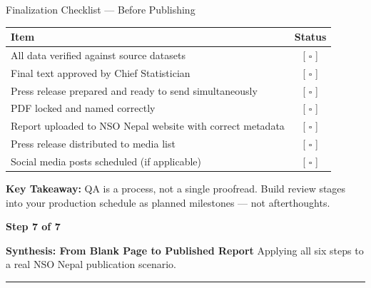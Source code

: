 \documentclass[xcolor={table,dvipsnames},aspectratio=169,11pt]{beamer}
\newcommand{\stepbadge}[1]{%
    \begin{tcolorbox}[colback=nsoGold,colframe=nsoGold,arc=8pt,auto outer arc,
        halign=center,valign=center,width=2.5cm,boxrule=0pt,top=2pt,bottom=2pt,left=2pt,right=2pt]
        \color{white}\tiny\bfseries #1
    \end{tcolorbox}%
}
\begin{document}
\begin{frame}{Finalization Checklist --- Before Publishing}
    \small
    \begin{tabular}{lc}
    \toprule
    \rowcolor{nsoBlue}\color{white}\bfseries Item & \color{white}\bfseries Status \\
    \midrule
    All data verified against source datasets & [ $\square$ ] \\
    Final text approved by Chief Statistician & [ $\square$ ] \\
    Press release prepared and ready to send simultaneously & [ $\square$ ] \\
    PDF locked and named correctly & [ $\square$ ] \\
    Report uploaded to NSO Nepal website with correct metadata & [ $\square$ ] \\
    Press release distributed to media list & [ $\square$ ] \\
    Social media posts scheduled (if applicable) & [ $\square$ ] \\
    \bottomrule
    \end{tabular}
    \vskip 0.2cm
    \begin{takeawaybox}
    \scriptsize \textbf{Key Takeaway:} QA is a process, not a single proofread. Build review stages into your production schedule as planned milestones --- not afterthoughts.
    \end{takeawaybox}
\end{frame}

{
\begin{frame}[plain]
    \vspace{1.5cm}
    \stepbadge{Step 7 of 7}
    \vskip 0.4cm
    {\color{white}\LARGE\bfseries Synthesis: From Blank Page to Published Report}
    \vskip 0.4cm
    {\color{nsoLight}\large Applying all six steps to a real NSO Nepal publication scenario.}
    \vskip 0.8cm
    \textcolor{nsoGold}{\rule{3cm}{3pt}}
\end{frame}
}
\end{document}
